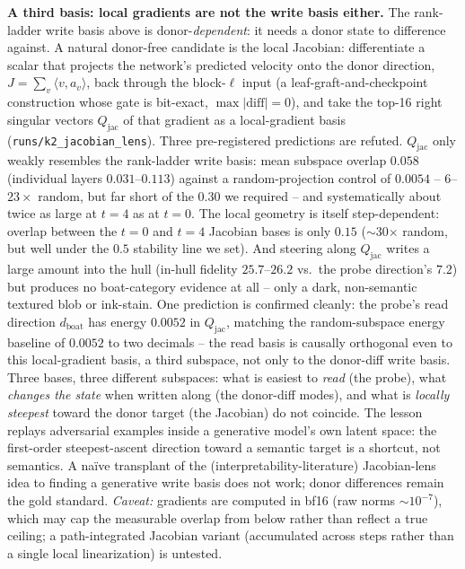 \documentclass[10pt,twocolumn]{article}
\begin{document}
\textbf{A third basis: local gradients are not the write basis
either.} The rank-ladder write basis above is donor-\emph{dependent}:
it needs a donor state to difference against. A natural donor-free
candidate is the local Jacobian: differentiate a scalar that projects
the network's predicted velocity onto the donor direction, $J =
\sum_v\langle v, a_v\rangle$, back through the block-$\ell$ input (a
leaf-graft-and-checkpoint construction whose gate is bit-exact,
$\max|\text{diff}|=0$), and take the top-16 right singular vectors
$Q_{\text{jac}}$ of that gradient as a local-gradient basis
(\texttt{runs/k2\_jacobian\_lens}). Three pre-registered predictions
are refuted. $Q_{\text{jac}}$ only weakly resembles the rank-ladder
write basis: mean subspace overlap $0.058$ (individual layers
$0.031$--$0.113$) against a random-projection control of $0.0054$ --
$6$--$23\times$ random, but far short of the $0.30$ we required -- and
systematically about twice as large at $t{=}4$ as at $t{=}0$. The
local geometry is itself step-dependent: overlap between the $t{=}0$
and $t{=}4$ Jacobian bases is only $0.15$ ($\sim$30$\times$ random,
but well under the $0.5$ stability line we set). And steering along
$Q_{\text{jac}}$ writes a large amount into the hull (in-hull fidelity
$25.7$--$26.2$ vs.\ the probe direction's $7.2$) but produces no
boat-category evidence at all -- only a dark, non-semantic textured
blob or ink-stain. One prediction is confirmed cleanly: the probe's
read direction $d_{\text{boat}}$ has energy $0.0052$ in
$Q_{\text{jac}}$, matching the random-subspace energy baseline of
$0.0052$ to two decimals -- the read basis is causally orthogonal even
to this local-gradient basis, a third subspace, not only to the
donor-diff write basis. Three bases, three different subspaces: what
is easiest to \emph{read} (the probe), what \emph{changes the state}
when written along (the donor-diff modes), and what is
\emph{locally steepest} toward the donor target (the Jacobian) do not
coincide. The lesson replays adversarial examples inside a generative
model's own latent space: the first-order steepest-ascent direction
toward a semantic target is a shortcut, not semantics. A na\"ive
transplant of the (interpretability-literature) Jacobian-lens idea to
finding a generative write basis does not work; donor differences
remain the gold standard. \emph{Caveat:} gradients are computed in
bf16 (raw norms $\sim10^{-7}$), which may cap the measurable overlap
from below rather than reflect a true ceiling; a path-integrated
Jacobian variant (accumulated across steps rather than a single local
linearization) is untested.
\end{document}
